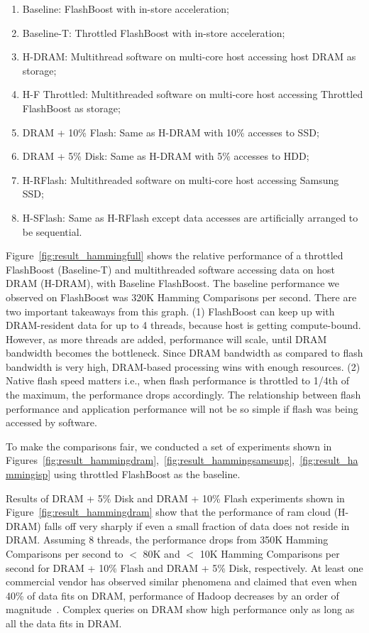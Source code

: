\begin{enumerate}
\item Baseline: FlashBoost with in-store acceleration;
\item Baseline-T: Throttled FlashBoost with in-store acceleration;
\item H-DRAM: Multithread software on multi-core host accessing host DRAM as storage;
\item H-F Throttled: Multithreaded software on multi-core host accessing Throttled FlashBoost as storage;
\item DRAM + 10\% Flash: Same as H-DRAM with 10\% accesses to SSD; 
\item DRAM + 5\% Disk: Same as H-DRAM with 5\% accesses to HDD;
\item H-RFlash: Multithreaded software on multi-core host accessing Samsung SSD;
\item H-SFlash: Same as H-RFlash except data accesses are artificially arranged to be sequential.
\end{enumerate}

Figure~\ref{fig:result_hammingfull} shows the relative performance of a
throttled FlashBoost (Baseline-T) and multithreaded software accessing data on
host DRAM (H-DRAM), with Baseline FlashBoost. The baseline performance we
observed on FlashBoost was 320K Hamming Comparisons per second. There are two
important takeaways from this graph. (1) FlashBoost can keep up with
DRAM-resident data for up to 4 threads, because host is getting compute-bound.
However, as more threads are added, performance will scale, until DRAM bandwidth
becomes the bottleneck. Since DRAM bandwidth as compared to flash bandwidth is
very high, DRAM-based processing wins with enough resources. (2) Native flash
speed matters i.e., when flash performance is throttled to 1/4th of the maximum, the performance drops accordingly. The relationship between flash performance and application performance will not be so simple if flash was being accessed by software.

To make the comparisons fair, we conducted a set of experiments shown in
Figures~\ref{fig:result_hammingdram},~\ref{fig:result_hammingsamsung},~\ref{fig:result_hammingisp} using throttled FlashBoost as the baseline. 

Results of DRAM + 5\% Disk and DRAM + 10\% Flash experiments shown in
Figure~\ref{fig:result_hammingdram} show that the performance of ram cloud (H-DRAM) falls off very sharply if even a small fraction of data does not reside in DRAM. Assuming 8 threads, the performance drops from 350K Hamming Comparisons per second to $<$ 80K and $<$ 10K Hamming Comparisons per second for DRAM + 10\% Flash and DRAM + 5\% Disk, respectively. At least one commercial vendor has observed similar phenomena and claimed that even when 40\% of data fits on DRAM, performance of Hadoop decreases by an order of magnitude~\cite{fusioniodram}. Complex queries on DRAM show high performance only as long as all the data fits in DRAM. 

